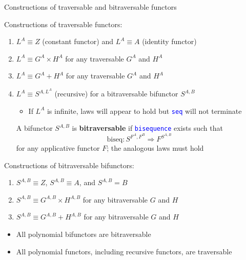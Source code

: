 \documentclass[english]{beamer}
\begin{document}
\begin{frame}{Constructions of traversable and bitraversable functors}

Constructions of traversable functors:
\begin{enumerate}
\item $L^{A}\equiv Z$ (constant functor) and $L^{A}\equiv A$ (identity
functor)
\item $L^{A}\equiv G^{A}\times H^{A}$ for any traversable $G^{A}$ and
$H^{A}$
\item $L^{A}\equiv G^{A}+H^{A}$ for any traversable $G^{A}$ and $H^{A}$
\item $L^{A}\equiv S^{A,L^{A}}$ (recursive) for a bitraversable bifunctor
$S^{A,B}$ 
\begin{itemize}
\item If $L^{A}$ is infinite, laws will appear to hold but \texttt{\textcolor{blue}{\footnotesize{}seq}}
will not terminate
\end{itemize}
A bifunctor $S^{A,B}$ is \textbf{bitraversable} if \texttt{\textcolor{blue}{\footnotesize{}bisequence}}
exists such that
\[
\text{biseq}:S^{F^{A},F^{B}}\Rightarrow F^{S^{A,B}}
\]
 for any applicative functor $F$; the analogous laws must hold
\end{enumerate}
Constructions of bitraversable bifunctors:
\begin{enumerate}
\item $S^{A,B}\equiv Z$, $S^{A,B}\equiv A$, and $S^{A,B}=B$
\item $S^{A,B}\equiv G^{A,B}\times H^{A,B}$ for any bitraversable $G$
and $H$
\item $S^{A,B}\equiv G^{A,B}+H^{A,B}$ for any bitraversable $G$ and $H$
\end{enumerate}
\begin{itemize}
\item All polynomial bifunctors are bitraversable
\item All polynomial functors, including recursive functors, are traversable
\end{itemize}
\end{frame}
\end{document}
